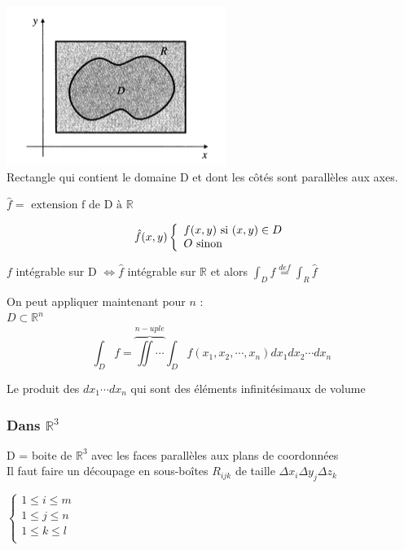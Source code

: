 \includegraphics[scale=1]{image4.png}
\\Rectangle qui contient le domaine D et dont les côtés sont parallèles aux axes.

$\hat{f} = \text{ extension f de D à } \mathbb{R}$


\[
\hat{f}(x,y)\left\{
\begin{array}{l r}
f(x,y)\text{ si }(x,y)\in D\\
O\text{ sinon}\\
\end{array}
\right.
\]

$f$ intégrable sur D $ \Longleftrightarrow \hat{f}$ intégrable sur $\mathbb{R}$ et alors
$\int_D f \overset{def}{=}\int_R \hat{f} $


On peut appliquer maintenant pour $n$ :
\\
$ D \subset \mathbb{R}^n$
$$\int_D f = \overbrace{\iint \cdots}^{n-uple} \int_D f(x_1,x_2,\cdots,x_n)dx_1 dx_2 \cdots dx_n $$

Le produit des $dx_1 \cdots dx_n $ qui sont des éléments infinitésimaux de volume






\subsubsection{Dans $\mathbb{R}^3$}





D = boite de $\mathbb{R}^3$ avec les faces parallèles aux plans de coordonnées\\

Il faut faire un découpage en sous-boîtes $ R_{ijk} $ de taille $\Delta x_i \Delta y_j \Delta z_k$

$\left\{
\begin{array}{l}
1 \le i \le m \\
1 \le j \le n \\
1 \le k \le l \\
\end{array}
\right. $

